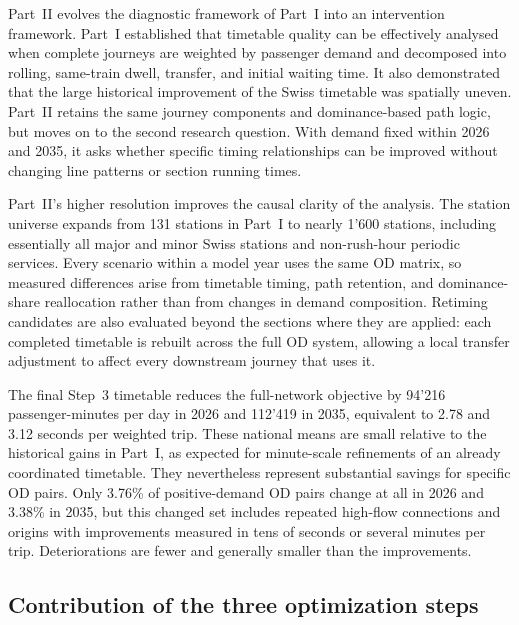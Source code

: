 \documentclass[preprint,12pt]{elsarticle}
\begin{document}
Part~II evolves the diagnostic framework of Part~I into an intervention framework. Part~I established that timetable quality can be effectively analysed when complete journeys are weighted by passenger demand and decomposed into rolling, same-train dwell, transfer, and initial waiting time. It also demonstrated that the large historical improvement of the Swiss timetable was spatially uneven. Part~II retains the same journey components and dominance-based path logic, but moves on to the second research question. With demand fixed within 2026 and 2035, it asks whether specific timing relationships can be improved without changing line patterns or section running times.

Part~II's higher resolution improves the causal clarity of the analysis. The station universe expands from 131 stations in Part~I to nearly 1'600 stations, including essentially all major and minor Swiss stations and non-rush-hour periodic services. Every scenario within a model year uses the same OD matrix, so measured differences arise from timetable timing, path retention, and dominance-share reallocation rather than from changes in demand composition. Retiming candidates are also evaluated beyond the sections where they are applied: each completed timetable is rebuilt across the full OD system, allowing a local transfer adjustment to affect every downstream journey that uses it.

The final Step~3 timetable reduces the full-network objective by 94'216 passenger-minutes per day in 2026 and 112'419 in 2035, equivalent to 2.78 and 3.12 seconds per weighted trip. These national means are small relative to the historical gains in Part~I, as expected for minute-scale refinements of an already coordinated timetable. They nevertheless represent substantial savings for specific OD pairs. Only 3.76\% of positive-demand OD pairs change at all in 2026 and 3.38\% in 2035, but this changed set includes repeated high-flow connections and origins with improvements measured in tens of seconds or several minutes per trip. Deteriorations are fewer and generally smaller than the improvements.


\subsection{Contribution of the three optimization steps}\label{sec:discussion-part2-steps}
\end{document}
